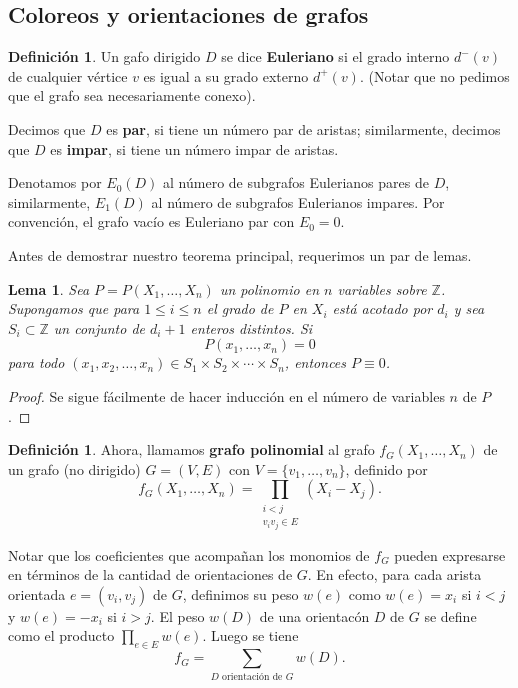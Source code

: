 \documentclass[12pt]{report}
\theoremstyle{plain}
\newtheorem{lemma}[theorem]{Lema}
\theoremstyle{definition}
\newtheorem{definition}[theorem]{Definición}
\newcommand{\integers}{\mathbb{Z}}
\begin{document}
\subsection{Coloreos y orientaciones de grafos}

\begin{definition}
Un gafo dirigido $D$ se dice \textbf{Euleriano} si el grado interno $d^- (v)$ de cualquier vértice $v$ es igual a su grado externo $d^+(v)$. (Notar que no pedimos que el grafo sea necesariamente conexo).

Decimos que $D$ es \textbf{par}, si tiene un número par de aristas; similarmente, decimos que $D$ es \textbf{impar}, si tiene un número impar de aristas.

Denotamos por $E_0 (D)$ al número de subgrafos Eulerianos pares de $D$, similarmente, $E_1 (D)$ al número de subgrafos Eulerianos impares. Por convención, el grafo vacío es Euleriano par con $E_0 =0$.
\end{definition}

Antes de demostrar nuestro teorema principal, requerimos un par de lemas.

\begin{lemma}\label{lema:coloreos y orientaciones de grafos - lema 1 del teorema principal}
Sea $P = P(X_1, \ldots, X_n)$ un polinomio en $n$ variables sobre $\integers$. Supongamos que para $1 \leq i \leq n$ el grado de $P$ en $X_i$ está acotado por $d_i$ y sea $S_i \subset \integers$ un conjunto de $d_i + 1$ enteros distintos. Si
\[
    P(x_1, \ldots, x_n) = 0
\]
para todo $(x_1, x_2, \ldots, x_n) \in S_1 \times S_2 \times \cdots \times S_n$, entonces $P \equiv 0$.
\end{lemma}
\begin{proof}
Se sigue fácilmente de hacer inducción en el número de variables $n$ de $P$.
\end{proof}

\begin{definition}
Ahora, llamamos \textbf{grafo polinomial} al grafo $f_G (X_1, \ldots, X_n)$ de un grafo (no dirigido) $G = (V,E)$ con $V = \{v_1, \ldots, v_n\}$, definido por
\[
    f_G (X_1, \ldots, X_n) = \prod_{\substack{i < j \\ v_iv_j \in E}} (X_i - X_j).
\]
\end{definition}

Notar que los coeficientes que acompañan los monomios de $f_G$ pueden expresarse en términos de la cantidad de orientaciones de $G$. En efecto, para cada arista orientada $e = (v_i, v_j)$ de $G$, definimos su peso $w (e)$ como $w (e) = x_i$ si $i < j$ y $w(e) = - x_i$ si $i > j$. El peso $w (D)$ de una orientacón $D$ de $G$ se define como el producto $\prod_{e \in E} w(e)$. Luego se tiene
\[
    f_G = \sum_{D \text{ orientación de $G$}} w(D).
\]
\end{document}
